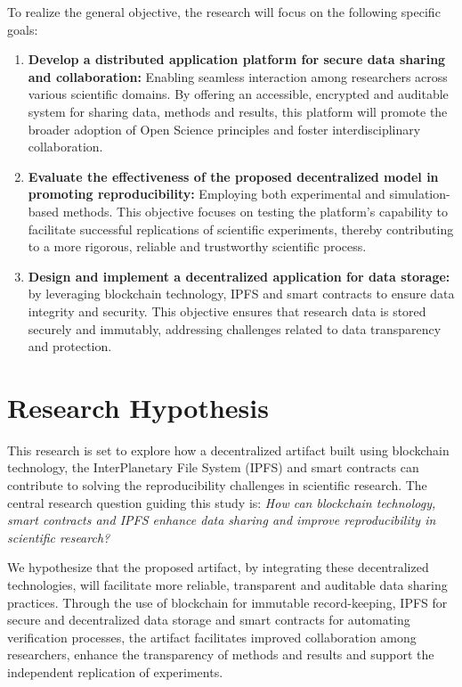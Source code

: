 \documentclass{article}
\begin{document}
To realize the general objective, the research will focus on the following specific goals:

\begin{enumerate}
    \item \textbf{Develop a distributed application platform for secure data sharing and collaboration:} Enabling seamless interaction among researchers across various scientific domains. By offering an accessible, encrypted and auditable system for sharing data, methods and results, this platform will promote the broader adoption of Open Science principles and foster interdisciplinary collaboration.

    \item \textbf{Evaluate the effectiveness of the proposed decentralized model in promoting reproducibility:} Employing both experimental and simulation-based methods. This objective focuses on testing the platform's capability to facilitate successful replications of scientific experiments, thereby contributing to a more rigorous, reliable and trustworthy scientific process.

    \item \textbf{Design and implement a decentralized application for data storage:} by leveraging blockchain technology, IPFS and smart contracts to ensure data integrity and security. This objective ensures that research data is stored securely and immutably, addressing challenges related to data transparency and protection.
\end{enumerate}

\section{Research Hypothesis}

This research is set to explore how a decentralized artifact built using blockchain technology, the  InterPlanetary File System (IPFS) and smart contracts can contribute to solving the reproducibility challenges in scientific research. The central research question guiding this study is: \textit{How can blockchain technology, smart contracts and IPFS enhance data sharing and improve reproducibility in scientific research?}

We hypothesize that the proposed artifact, by integrating these decentralized technologies, will facilitate more reliable, transparent and auditable data sharing practices. Through the use of blockchain for immutable record-keeping, IPFS for secure and decentralized data storage and smart contracts for automating verification processes, the artifact facilitates improved collaboration among researchers, enhance the transparency of methods and results and support the independent replication of experiments.
\end{document}
